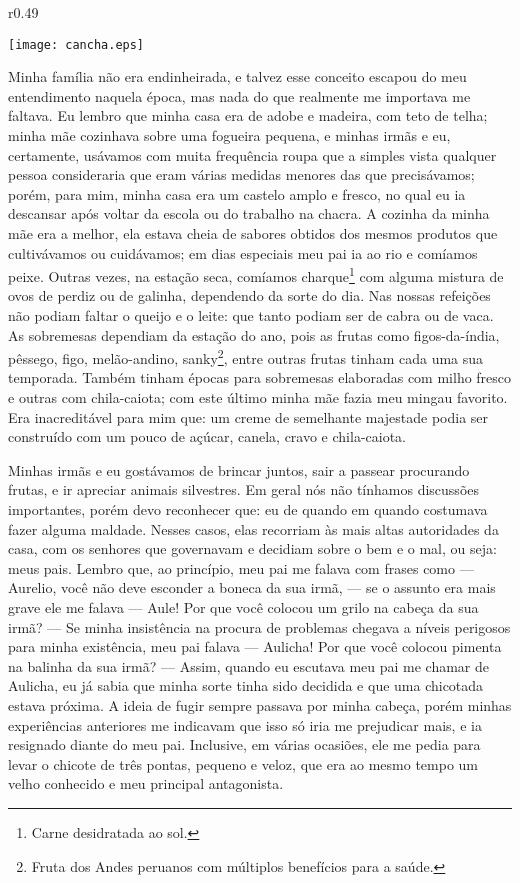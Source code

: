 \begin{wrapfigure}{r}{0.49\textwidth}
  \begin{center}
  \vspace{-20pt}
    \texttt{[image: cancha.eps]}
  \end{center}
  \vspace{-20pt}
\end{wrapfigure}
Minha família não era endinheirada, e talvez esse conceito escapou do meu entendimento naquela época, mas nada do que realmente me importava me faltava.
Eu lembro que minha casa era de adobe e madeira, com teto de telha; minha mãe cozinhava sobre uma fogueira pequena, e minhas irmãs e eu, certamente, usávamos com muita frequência roupa que a simples vista qualquer pessoa consideraria que eram várias medidas menores das que precisávamos;
porém, para mim, minha casa era um castelo amplo e fresco, no qual eu ia descansar após voltar da escola ou do trabalho na chacra. 
A cozinha da minha mãe era a melhor, ela estava cheia de sabores obtidos dos mesmos produtos que cultivávamos ou cuidávamos; em dias especiais meu pai ia ao rio e comíamos peixe. Outras vezes, na estação seca, comíamos charque\footnote{Carne desidratada ao sol.} com alguma mistura de ovos de perdiz ou de galinha, dependendo da sorte do dia.
Nas nossas refeições não podiam faltar o queijo e o leite: que tanto podiam ser de cabra ou de vaca.
As sobremesas dependiam da estação do ano, pois as frutas como figos-da-índia, pêssego, figo, melão-andino, sanky\footnote{Fruta dos Andes peruanos com múltiplos benefícios para a saúde.}, entre outras frutas tinham cada uma sua temporada. Também tinham épocas para sobremesas elaboradas com milho fresco e outras com chila-caiota; com este último minha mãe fazia meu mingau favorito. Era inacreditável para mim que: um creme de semelhante majestade podia ser construído com um pouco de açúcar, canela, cravo e chila-caiota.

Minhas irmãs e eu gostávamos de brincar juntos, sair a passear procurando frutas, e ir apreciar animais silvestres. Em geral nós não tínhamos discussões importantes, porém devo reconhecer que: eu de quando em quando costumava fazer alguma maldade.
Nesses casos, elas recorriam às mais altas autoridades da casa, com os senhores que governavam e decidiam sobre o bem e o mal, ou seja: meus pais. 
Lembro que, ao princípio, meu pai me falava com frases como --- Aurelio, você não deve esconder a boneca da sua irmã, --- se o assunto era mais grave ele me falava --- Aule! Por que você colocou um grilo na cabeça da sua irmã? --- Se minha insistência na procura de problemas chegava a níveis perigosos para minha existência, meu pai falava --- Aulicha! Por que você colocou pimenta na balinha da sua irmã? ---
Assim, quando eu escutava meu pai me chamar de Aulicha, eu já sabia que minha sorte tinha sido decidida e que uma chicotada estava próxima. A ideia de fugir sempre passava por minha cabeça, porém minhas experiências anteriores me indicavam que isso só iria me prejudicar mais, e ia resignado diante do meu pai. Inclusive, em várias ocasiões, ele me pedia para levar o chicote de três pontas, pequeno e veloz, que era ao mesmo tempo um velho conhecido e meu principal antagonista.

